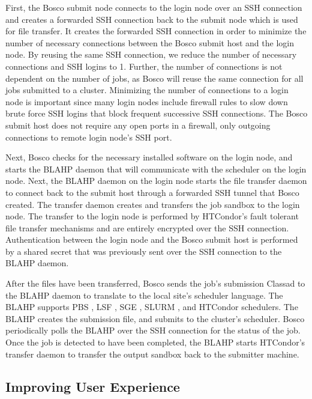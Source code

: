First, the Bosco submit node connects to the login node over an SSH connection and creates a forwarded SSH connection back to the submit node which is used for file transfer.  It creates the forwarded SSH connection in order to minimize the number of necessary connections between the Bosco submit host and the login node.  By reusing the same SSH connection, we reduce the number of necessary connections and SSH logins to 1.  Further, the number of connections is not dependent on the number of jobs, as Bosco will reuse the same connection for all jobs submitted to a cluster.  Minimizing the number of connections to a login node is important since many login nodes include firewall rules to slow down brute force SSH logins that block frequent successive SSH connections.  The Bosco submit host does not require any open ports in a firewall, only outgoing connections to remote login node's SSH port.

Next, Bosco checks for the necessary installed software on the login node, and starts the BLAHP daemon that will communicate with the scheduler on the login node.  Next, the BLAHP daemon on the login node starts the file transfer daemon to connect back to the submit host through a forwarded SSH tunnel that Bosco created.  The transfer daemon creates and transfers the job sandbox to the login node.  The transfer to the login node is performed by HTCondor's fault tolerant file transfer mechanisms and are entirely encrypted over the SSH connection.  Authentication between the login node and the Bosco submit host is performed by a shared secret that was previously sent over the SSH connection to the BLAHP daemon.

After the files have been transferred, Bosco sends the job's submission Classad \cite{raman1998matchmaking} to the BLAHP daemon to translate to the local site's scheduler language.  The BLAHP supports PBS \cite{computing2013torque}, LSF \cite{computinglsf}, SGE \cite{gentzsch2001sun}, SLURM \cite{yoo2003slurm}, and HTCondor schedulers.  The BLAHP creates the submission file, and submits to the cluster's scheduler.  Bosco periodically polls the BLAHP over the SSH connection for the status of the job.  Once the job is detected to have been completed, the BLAHP starts HTCondor's transfer daemon to transfer the output sandbox back to the submitter machine.

\subsection{Improving User Experience}

